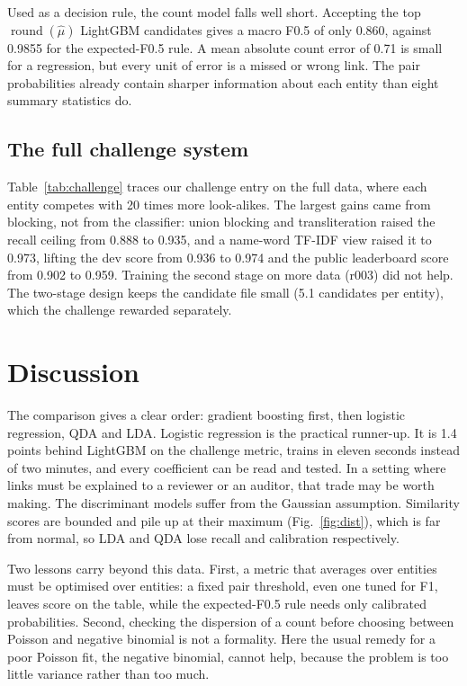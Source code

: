 Used as a decision rule, the count model falls well short. Accepting the top $\operatorname{round}(\hat\mu)$
LightGBM candidates gives a macro F0.5 of only 0.860, against 0.9855 for the expected-F0.5 rule. A mean absolute
count error of 0.71 is small for a regression, but every unit of error is a missed or wrong link. The pair
probabilities already contain sharper information about each entity than eight summary statistics do.



\subsection{The full challenge system}
Table~\ref{tab:challenge} traces our challenge entry on the full data, where each entity competes with 20 times
more look-alikes. The largest gains came from blocking, not from the classifier: union blocking and transliteration
raised the recall ceiling from 0.888 to 0.935, and a name-word TF-IDF view raised it to 0.973, lifting the dev score
from 0.936 to 0.974 and the public leaderboard score from 0.902 to 0.959. Training the second stage on more data
(r003) did not help. The two-stage design keeps the candidate file small (5.1 candidates per entity), which the
challenge rewarded separately.

\section{Discussion}
The comparison gives a clear order: gradient boosting first, then logistic regression, QDA and LDA. Logistic
regression is the practical runner-up. It is 1.4 points behind LightGBM on the challenge metric, trains in eleven
seconds instead of two minutes, and every coefficient can be read and tested. In a setting where links must be
explained to a reviewer or an auditor, that trade may be worth making. The discriminant models suffer from the
Gaussian assumption. Similarity scores are bounded and pile up at their maximum (Fig.~\ref{fig:dist}), which is
far from normal, so LDA and QDA lose recall and calibration respectively.

Two lessons carry beyond this data. First, a metric that averages over entities must be optimised over entities:
a fixed pair threshold, even one tuned for F1, leaves score on the table, while the expected-F0.5 rule needs only
calibrated probabilities. Second, checking the dispersion of a count before choosing between Poisson and negative
binomial is not a formality. Here the usual remedy for a poor Poisson fit, the negative binomial, cannot help,
because the problem is too little variance rather than too much.

